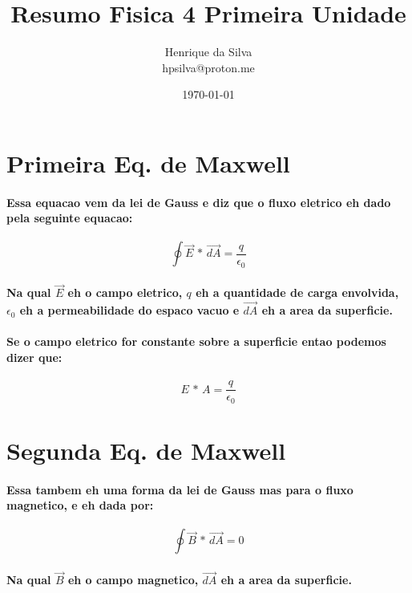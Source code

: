 \documentclass[12pt,twoside, a4paper, twocolumn]{article}
\title{Resumo Fisica 4 Primeira Unidade}
\author{Henrique da Silva \\ hpsilva@proton.me}
\date{\today}
\begin{document}
\maketitle
{}
\newpage
\tableofcontents
\newpage

\newcommand\deriv[2]{\frac{\mathrm d #1}{\mathrm d #2}}

\section{Primeira Eq. de Maxwell}
\paragraph{Essa equacao vem da lei de Gauss e diz que o fluxo eletrico eh dado pela seguinte equacao:
}
\begin{equation}
    \oint \vec{E} \, * \, \vec{dA} = \frac{q}{\epsilon_0}
\end{equation}
\paragraph*{Na qual $\vec{E}$ eh o campo eletrico, $q$ eh a quantidade de carga envolvida, $\epsilon_0$ eh a permeabilidade do espaco vacuo e $\vec{dA}$ eh a area da superficie.}
\paragraph*{Se o campo eletrico for constante sobre a superficie entao podemos dizer que:}
\begin{equation}
    E \, * \, A = \frac{q}{\epsilon_0}
\end{equation}


\section{Segunda Eq. de Maxwell}
\paragraph*{Essa tambem eh uma forma da lei de Gauss mas para o fluxo magnetico, e eh dada por:}
\begin{equation}
    \oint  \vec{B} \, * \, \vec{dA} = 0
\end{equation}
\paragraph*{Na qual $\vec{B}$ eh o campo magnetico, $\vec{dA}$ eh a area da superficie.}
\end{document}
